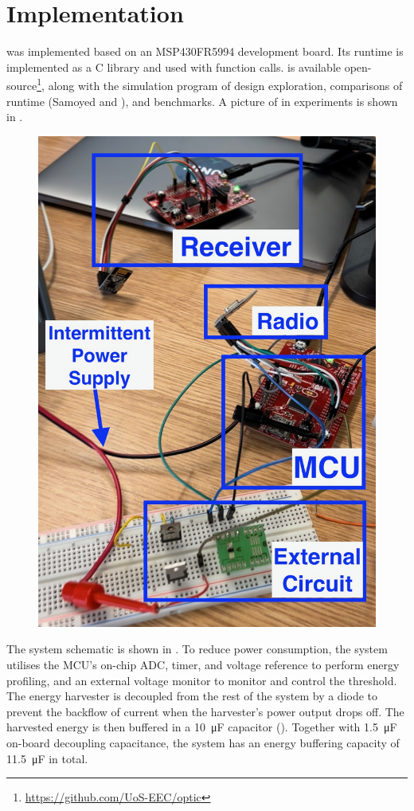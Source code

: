 \section{Implementation} \label{sec:implementation}

\nn{} was implemented based on an MSP430FR5994 development board.
Its runtime is implemented as a C library and used with function calls. 
\nn{} is available open-source\footnote{\url{https://github.com/UoS-EEC/optic}}, along with the simulation program of design exploration, comparisons of runtime (Samoyed and \debs{}), and benchmarks.
A picture of \nn{} in experiments is shown in .

\begin{figure}[!t]
    \centering
    \includegraphics[width=0.65\columnwidth]{ch5_optic/figures/experiment.png}
    \caption{}
    \label{fig:experiment_photo}
\end{figure}

The system schematic is shown in .
To reduce power consumption, the system utilises the MCU's on-chip ADC, timer, and voltage reference to perform energy profiling, and an external voltage monitor to monitor and control the threshold. 
The energy harvester is decoupled from the rest of the system by a diode to prevent the backflow of current when the harvester's power output drops off.
The harvested energy is then buffered in a \SI{10}{\micro\farad} capacitor (). 
Together with \SI{1.5}{\micro\farad} on-board decoupling capacitance, the system has an energy buffering capacity of \SI{11.5}{\micro\farad} in total. 

